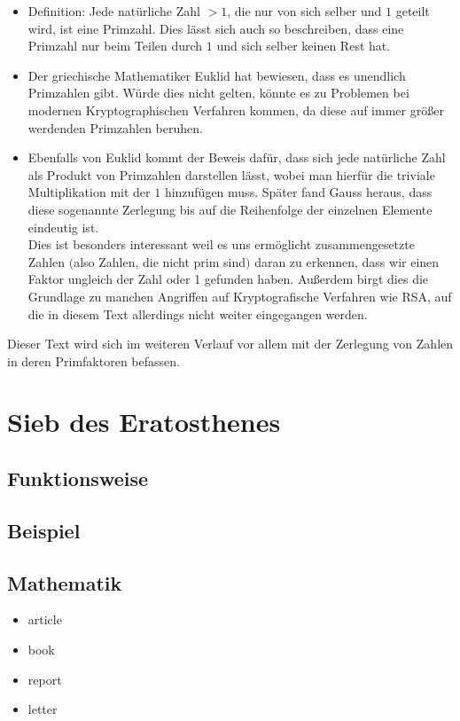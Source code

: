 \documentclass[12pt, a4paper, titlepage,twoside]{article}
\begin{document}
	\begin{itemize}
		\item Definition: Jede nat\"urliche Zahl $>1$, die nur von sich selber und  $1$ geteilt wird, ist eine Primzahl. Dies l\"asst sich auch so beschreiben, dass eine Primzahl nur beim Teilen durch $1$ und sich selber keinen Rest hat.
		\item Der griechische Mathematiker Euklid hat bewiesen, dass es unendlich Primzahlen gibt. W\"urde dies nicht gelten, k\"onnte es zu Problemen bei modernen Kryptographischen Verfahren kommen, da diese auf immer gr\"oßer werdenden Primzahlen beruhen. 
		\item  Ebenfalls von Euklid kommt der Beweis daf\"ur, dass sich jede nat\"urliche Zahl als Produkt von Primzahlen darstellen l\"asst, wobei man hierf\"ur die triviale Multiplikation mit der $1$ hinzuf\"ugen muss. Sp\"ater fand Gauss heraus, dass diese sogenannte Zerlegung bis auf die Reihenfolge der einzelnen Elemente eindeutig ist. \\
		Dies ist besonders interessant weil es uns erm\"oglicht zusammengesetzte Zahlen $($also Zahlen, die nicht prim sind$)$ daran zu erkennen, dass wir einen Faktor ungleich der Zahl oder 1 gefunden haben. Außerdem birgt dies die Grundlage zu manchen Angriffen auf Kryptografische Verfahren wie RSA, auf die in diesem Text allerdings nicht weiter eingegangen werden.
	\end{itemize}
	
	Dieser Text wird sich im weiteren Verlauf vor allem mit der Zerlegung von Zahlen in deren Primfaktoren befassen. 

 

		
	\section{Sieb des Eratosthenes} \label{Sieb des Eratosthenes}
	
	\subsection{Funktionsweise}
	\subsection{Beispiel}
	\subsection{Mathematik}
	\begin{itemize}
	
		\item article
		\item book 
		\item report 
		\item letter 
	\end{itemize}
	
\end{document}
